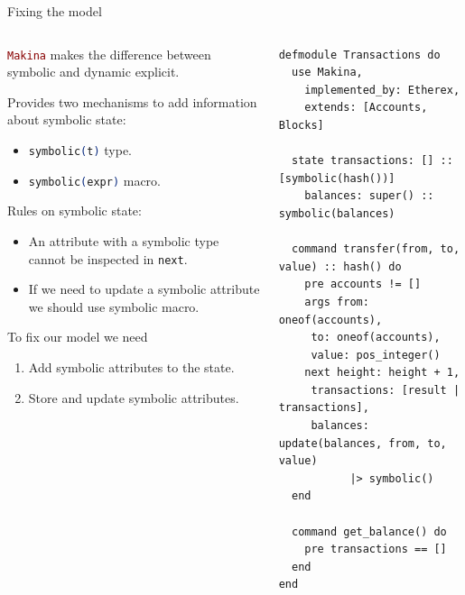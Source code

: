 \documentclass[aspectratio=169, 10pt, handout]{beamer}
\begin{document}
\begin{frame}[label={sec:orgb8052e7},fragile]{Fixing the model}
 \begin{columns}
\begin{column}{0.44\columnwidth}
\lstinline[language=elixir, style=display]~Makina~ makes the difference between symbolic and dynamic explicit.

\vspace{10pt}

Provides two mechanisms to add information about symbolic state:
\begin{itemize}
\item \lstinline[language=elixir, style=display]~symbolic(t)~ type.
\item \lstinline[language=elixir, style=display]~symbolic(expr)~ macro.
\end{itemize}

Rules on symbolic state:
\begin{itemize}
\item An attribute with a symbolic type cannot be inspected in \lstinline[language=elixir, style=display]~next~.
\item If we need to update a symbolic attribute we should use symbolic macro.
\end{itemize}

\vspace{10pt}

To fix our model we need
\begin{enumerate}
\item Add symbolic attributes to the state.
\item Store and update symbolic attributes.
\end{enumerate}
\end{column}

\begin{column}{0.52\columnwidth}
\onslide<+->
\vspace{-10pt}
\lstset{language=elixir,label= ,caption= ,captionpos=b,numbers=none,style=display}
\begin{lstlisting}
defmodule Transactions do
  use Makina,
    implemented_by: Etherex,
    extends: [Accounts, Blocks]

  state transactions: [] :: [symbolic(hash())]
	balances: super() :: symbolic(balances)

  command transfer(from, to, value) :: hash() do
    pre accounts != []
    args from: oneof(accounts),
	 to: oneof(accounts),
	 value: pos_integer()
    next height: height + 1,
	 transactions: [result | transactions],
	 balances: update(balances, from, to, value)
		   |> symbolic()
  end

  command get_balance() do
    pre transactions == []
  end
end
\end{lstlisting}
\end{column}
\end{columns}
\end{frame}
\end{document}
